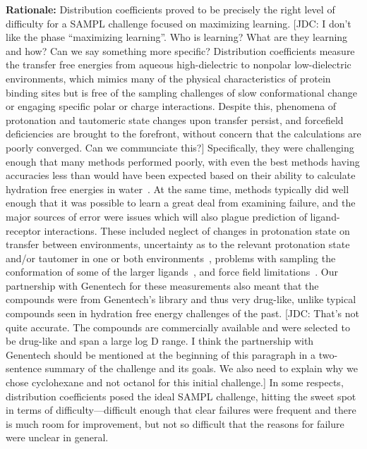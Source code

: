 \documentclass[11pt]{article}
\begin{document}
{\bf Rationale:}
Distribution coefficients proved to be precisely the right level of difficulty for a SAMPL challenge focused on maximizing learning. 
{\color{red}[JDC: I don't like the phase ``maximizing learning''. Who is learning? What are they learning and how? Can we say something more specific? Distribution coefficients measure the transfer free energies from aqueous high-dielectric to nonpolar low-dielectric environments, which mimics many of the physical characteristics of protein binding sites but is free of the sampling challenges of slow conformational change or engaging specific polar or charge interactions. Despite this, phenomena of protonation and tautomeric state changes upon transfer persist, and forcefield deficiencies are brought to the forefront, without concern that the calculations are poorly converged. Can we communciate this?]}
Specifically, they were challenging enough that many methods performed poorly, with even the best methods having accuracies less than would have been expected based on their ability to calculate hydration free energies in water~\cite{bannan_calculating_2016}. 
At the same time, methods typically did well enough that it was possible to learn a great deal from examining failure, and the major sources of error were issues which will also plague prediction of ligand-receptor interactions.
These included neglect of changes in protonation state on transfer between environments, uncertainty as to the relevant protonation state and/or tautomer in one or both environments~\cite{bannan_calculating_2016}, problems with sampling the conformation of some of the larger ligands~\cite{bannan_calculating_2016, luchko_sampl5:_2016}, and force field limitations~\cite{paranahewage_predicting_2016}. 
Our partnership with Genentech for these measurements also meant that the compounds were from Genentech's library and thus very drug-like, unlike typical compounds seen in hydration free energy challenges of the past.
{\color{red}[JDC: That's not quite accurate. The compounds are commercially available and were selected to be drug-like and span a large log D range. I think the partnership with Genentech should be mentioned at the beginning of this paragraph in a two-sentence summary of the challenge and its goals. We also need to explain why we chose cyclohexane and not octanol for this initial challenge.]}
In some respects, distribution coefficients posed the ideal SAMPL challenge, hitting the sweet spot in terms of difficulty---difficult enough that clear failures were frequent and there is much room for improvement, but not so difficult that the reasons for failure were unclear in general. 
\end{document}
